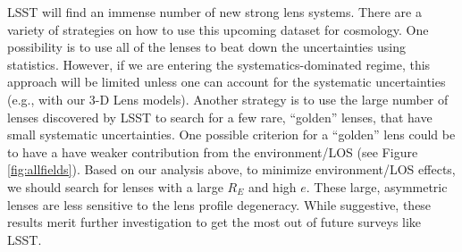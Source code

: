 LSST will find an immense number of new strong lens systems. There are a variety of strategies on how to use this upcoming dataset for cosmology. One possibility is to use all of the lenses to beat down the uncertainties using statistics. However, if we are entering the systematics-dominated regime, this approach will be limited unless one can account for the systematic uncertainties (e.g., with our 3-D Lens models). Another strategy is to use the large number of lenses discovered by LSST to search for a few rare, ``golden'' lenses, that have small systematic uncertainties. One possible criterion for a ``golden'' lens could be to have a have weaker contribution from the environment/LOS (see Figure \ref{fig:allfields}). Based on our analysis above, to minimize environment/LOS effects, we should search for lenses with a large $R_E$ and high $e$. These large,  asymmetric lenses are less sensitive to the lens profile degeneracy. While suggestive, these results merit further investigation to get the most out of future surveys like LSST.
  
